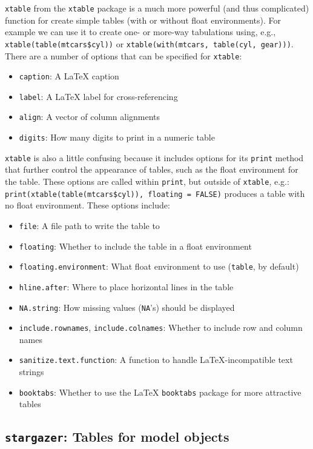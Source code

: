 \documentclass[11pt, a4paper]{article}
\begin{document}
\texttt{xtable} from the \texttt{xtable} package is a much more powerful (and thus complicated) function for create simple tables (with or without float environments). For example we can use it to create one- or more-way tabulations using, e.g., \verb|xtable(table(mtcars$cyl))| or \verb|xtable(with(mtcars, table(cyl, gear)))|. There are a number of options that can be specified for \texttt{xtable}:

\begin{itemize}
\item \texttt{caption}: A \LaTeX{} caption
\item \texttt{label}: A \LaTeX{} label for cross-referencing
\item \texttt{align}: A vector of column alignments
\item \texttt{digits}: How many digits to print in a numeric table
\end{itemize}

\noindent \texttt{xtable} is also a little confusing because it includes options for its \texttt{print} method that further control the appearance of tables, such as the float environment for the table. These options are called within \texttt{print}, but outside of \texttt{xtable}, e.g.: \verb|print(xtable(table(mtcars$cyl)), floating = FALSE)| produces a table with no float environment. These options include:

\begin{itemize}
\item \texttt{file}: A file path to write the table to
\item \texttt{floating}: Whether to include the table in a float environment
\item \texttt{floating.environment}: What float environment to use (\texttt{table}, by default)
\item \texttt{hline.after}: Where to place horizontal lines in the table
\item \texttt{NA.string}: How missing values (\texttt{NA}'s) should be displayed
\item \texttt{include.rownames}, \texttt{include.colnames}: Whether to include row and column names
\item \texttt{sanitize.text.function}: A function to handle \LaTeX{}-incompatible text strings
\item \texttt{booktabs}: Whether to use the \LaTeX{} \texttt{booktabs} package for more attractive tables
\end{itemize}


\pagebreak
\subsection*{\texttt{stargazer}: Tables for model objects}
\end{document}
